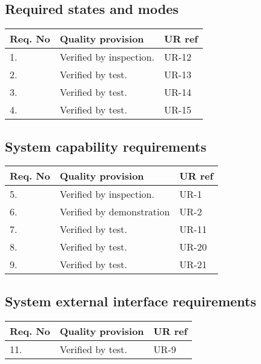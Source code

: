 \subsection{Required states and modes}
\begin{center}
    \begin{tabular}{ | l | p{9cm} | l |}
    \hline	
    Req. No & Quality provision  									& UR ref \\ \hline
		1. & Verified by inspection.  & UR-12 \\ \hline
		2. & Verified by test.  & UR-13 \\ \hline
		3. & Verified by test.  & UR-14 \\ \hline		
		4. & Verified by test.  & UR-15 \\ \hline
    \end{tabular}
\end{center}

\subsection{System capability requirements}
\begin{center}
    \begin{tabular}{ | l | p{9cm} | l |}
    \hline	
    Req. No & Quality provision  									& UR ref \\ \hline
		5. & Verified by inspection.  								& UR-1 \\ \hline
		6. & Verified by demonstration								& UR-2 \\ \hline
		7. & Verified by test.										& UR-11 \\ \hline
		8. & Verified by test.  									& UR-20 \\ \hline	
		9. & Verified by test.		  								& UR-21 \\ \hline	
    \end{tabular}
\end{center}

\subsection{System external interface requirements}
\begin{center}
    \begin{tabular}{ | l | p{9cm} | l |}
    \hline
    Req. No & Quality provision  & UR ref \\ \hline
	11. & Verified by test.  								& UR-9 \\ \hline
    \end{tabular}
\end{center}

